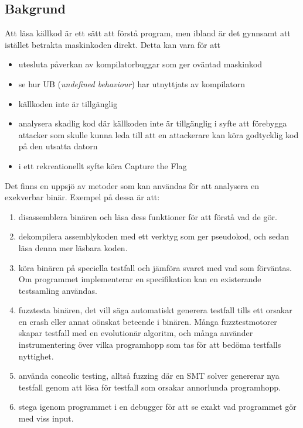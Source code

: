 \subsection{Bakgrund}

Att läsa källkod är ett sätt att förstå program, men ibland är det gynnsamt att istället betrakta
maskinkoden direkt. Detta kan vara för att
\begin{itemize}
  \item utesluta påverkan av kompilatorbuggar som ger oväntad maskinkod
  \item se hur UB (\emph{undefined behaviour}) har utnyttjats av kompilatorn
  \item källkoden inte är tillgänglig
  \item analysera skadlig kod där källkoden inte är tillgänglig i syfte att förebygga 
    attacker som skulle kunna leda till att en attackerare kan köra godtycklig kod 
    på den utsatta datorn
  \item i ett rekreationellt syfte köra Capture the Flag
\end{itemize}

Det finns en uppsjö av metoder som kan användas för att analysera en exekverbar
binär. Exempel på dessa är att: 
\begin{enumerate}
  \item disassemblera binären och läsa dess funktioner för att förstå vad de gör.
  \item dekompilera assemblykoden med ett verktyg som ger pseudokod, och sedan läsa denna mer
    läsbara koden.
  \item köra binären på speciella testfall och jämföra svaret med vad som förväntas. Om
    programmet implementerar en specifikation kan en existerande testsamling användas.
  \item fuzztesta binären, det vill säga automatiskt generera testfall tills ett orsakar en crash eller
    annat oönskat beteende i binären. Många fuzztestmotorer skapar testfall med en evolutionär
    algoritm, och många använder instrumentering över vilka programhopp som tas för att bedöma
    testfalls nyttighet.
  \item använda concolic testing, alltså fuzzing där en SMT solver genererar nya testfall genom att
    lösa för testfall som orsakar annorlunda programhopp.
  \item stega igenom programmet i en debugger för att se exakt vad programmet gör med viss input.
\end{enumerate}

